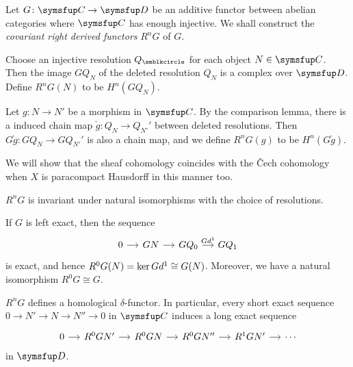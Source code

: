 \begin{definition}
  Let $G\colon \CAT{C}\to \CAT{D}$ be an additive functor between abelian categories where $\CAT{C}$ has enough injective. We shall construct the \emph{covariant right derived functors} $R^nG$ of $G$.

  Choose an injective resolution $Q_\CCCIR$ for each object $N\in\CAT{C}$. Then the image $GQ_N$ of the deleted resolution $Q_N$ is a complex over $\CAT{D}$. Define $R^nG(N)$ to be $H^n(GQ_N)$.

  Let $g\colon N\to N'$ be a morphism in $\CAT{C}$. By the comparison lemma, there is a induced chain map $\check g\colon Q_N\to Q_{N'}'$ between deleted resolutions. Then $G\check g\colon GQ_N\to GQ_{N'}'$ is also a chain map, and we define $R^nG(g)$ to be $H^n(G\check g)$.

  We will show that the sheaf cohomology coincides with the \v{C}ech cohomology when $X$ is paracompact Hausdorff in this manner too.
\end{definition}

\begin{remark}
  $R^nG$ is invariant under natural isomorphisms with the choice of resolutions.
\end{remark}

\begin{remark}
  If $G$ is left exact, then the sequence
  \begin{equation*}
    \begin{tikzcd}[sep=small]
      0 & GN & GQ_0 & GQ_1
      \arrow[from=1-1,]{1-2}[]{}
      \arrow[from=1-2,]{1-3}[]{}
      \arrow[from=1-3,]{1-4}[]{Gd^1}
    \end{tikzcd}
  \end{equation*}
  is exact, and hence $R^0G(N)=\operatorname{ker} Gd^1 \cong G(N)$. Moreover, we have a natural isomorphism $R^0G\cong G$.
\end{remark}

\begin{proposition}
  $R^nG$ defines a homological $\delta$-functor. In particular, every short exact sequence $0\to N'\to N\to N''\to 0$ in $\CAT{C}$ induces a long exact sequence
  \begin{equation*}
    \begin{tikzcd}[sep=small]
      0 & R^0GN' & R^0GN & R^0GN'' & R^1GN' & \dotsb
      \arrow[from=1-1,]{1-2}[]{}
      \arrow[from=1-2,]{1-3}[]{}
      \arrow[from=1-3,]{1-4}[]{}
      \arrow[from=1-4,]{1-5}[]{}
      \arrow[from=1-5,]{1-6}[]{}
    \end{tikzcd}
  \end{equation*}
  in $\CAT{D}$.
\end{proposition}

